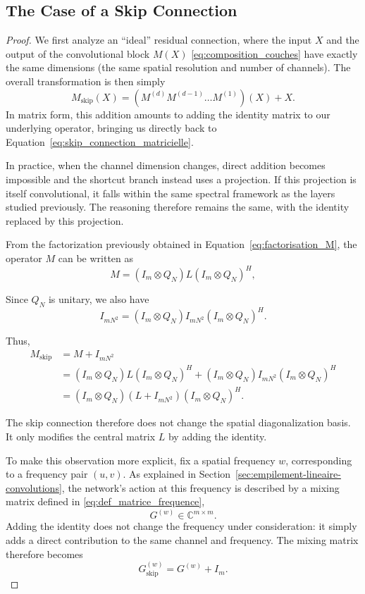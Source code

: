 \subsection{The Case of a Skip Connection}

\begin{proof}

We first analyze an ``ideal'' residual connection, where the input $X$ and the output
of the convolutional block $M(X)$ \eqref{eq:composition_couches} have exactly the same dimensions (the same spatial resolution and number
of channels). The overall transformation is then simply
$$
M_{\mathrm{skip}}(X) = (M^{(d)} M^{(d-1)} \dots M^{(1)})(X) + X.
$$
In matrix form, this addition amounts to adding the identity matrix to our underlying operator,
bringing us directly back to Equation~\eqref{eq:skip_connection_matricielle}.

In practice, when the channel dimension changes, direct addition becomes impossible and the
shortcut branch instead uses a projection.
If this projection is itself convolutional, it falls within the same spectral framework as the layers
studied previously. The reasoning therefore remains the same, with the identity replaced by this projection.

From the factorization previously obtained in Equation~\eqref{eq:factorisation_M}, the operator $M$ can
be written as
\[
M = (I_m \otimes Q_N)L(I_m \otimes Q_N)^H,
\]

Since $Q_N$ is unitary, we also have
\[
I_{mN^2}
=
(I_m \otimes Q_N)I_{mN^2}(I_m \otimes Q_N)^H.
\]

Thus,
\begin{align*}
M_{\mathrm{skip}}
&= M + I_{mN^2} \\
&= (I_m \otimes Q_N)L(I_m \otimes Q_N)^H
+
(I_m \otimes Q_N)I_{mN^2}(I_m \otimes Q_N)^H \\
&= (I_m \otimes Q_N)(L + I_{mN^2})(I_m \otimes Q_N)^H.
\end{align*}

The skip connection therefore does not change the spatial diagonalization basis. It only modifies the
central matrix $L$ by adding the identity.

To make this observation more explicit, fix a spatial frequency $w$, corresponding to a frequency
pair $(u,v)$. As explained in Section~\ref{sec:empilement-lineaire-convolutions}, the network's action
at this frequency is described by a mixing matrix defined in \eqref{eq:def_matrice_frequence},
\[
G^{(w)} \in \mathbb{C}^{m \times m}.
\]
Adding the identity does not change the frequency under consideration: it simply adds a direct contribution
to the same channel and frequency. The mixing matrix therefore becomes
\[
G_{\mathrm{skip}}^{(w)} = G^{(w)} + I_m.
\]


\end{proof}
